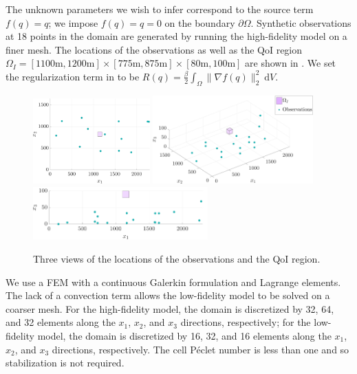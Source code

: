 \documentclass[review,sort&compress]{elsarticle}
\begin{document}
The unknown parameters we wish to infer correspond to the source term $f(q)=q$; we impose $f(q)=q=0$ on the boundary $\partial\Omega$. Synthetic observations at 18 points in the domain are generated by running the high-fidelity model on a finer mesh. The locations of the observations as well as the QoI region $\Omega_I=[1100\textrm{m},1200\textrm{m}]\times[775\textrm{m},875\textrm{m}]\times[80\textrm{m},100\textrm{m}]$ are shown in . We set the regularization term in  to be $R(q)=\frac{\beta}{2}\int_\Omega \|\nabla f(q)\|_2^2\:\textrm{d}V$.
%
\begin{figure}[htbp]
\centering
\includegraphics[width=0.4\textwidth]{series3D/setup_aerial_nolegend.pdf} \hfill
\includegraphics[width=0.55\textwidth]{series3D/setup_3view.pdf} \\
\vspace{\baselineskip}
\includegraphics[width=0.6\textwidth]{series3D/setup_side_view.pdf}
\caption{Three views of the locations of the observations and the QoI region.}
\label{fig:setup3D}
\end{figure}
%

We use a FEM with a continuous Galerkin formulation and Lagrange elements. The lack of a convection term allows the low-fidelity model to be solved on a coarser mesh. For the high-fidelity model, the domain is discretized by 32, 64, and 32 elements along the $x_1$, $x_2$, and $x_3$ directions, respectively; for the low-fidelity model, the domain is discretized by 16, 32, and 16 elements along the $x_1$, $x_2$, and $x_3$ directions, respectively. The cell P\'{e}clet number is less than one and so stabilization is not required.
\end{document}
